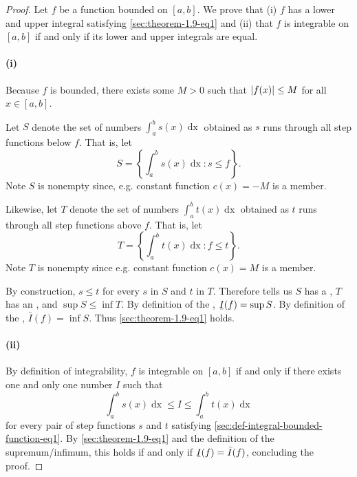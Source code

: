 \documentclass{report}
\begin{document}
\begin{proof}

  Let $f$ be a function bounded on $[a, b]$.
  We prove that (i) $f$ has a lower and upper integral satisfying
    \eqref{sec:theorem-1.9-eq1} and (ii) that $f$ is integrable on $[a, b]$ if
    and only if its lower and upper integrals are equal.

  \paragraph{(i)}%

    Because $f$ is bounded, there exists some $M > 0$ such that
      $\left|f(x)\right| \leq M$ for all $x \in [a, b]$.

    Let $S$ denote the set of numbers $\int_a^b s(x) \mathop{dx}$ obtained as
      $s$ runs through all step functions below $f$.
    That is, let $$S = \left\{ \int_a^b s(x) \mathop{dx} : s \leq f \right\}.$$
    Note $S$ is nonempty since, e.g. constant function $c(x) = -M$ is a member.

    Likewise, let $T$ denote the set of numbers $\int_a^b t(x) \mathop{dx}$
      obtained as $t$ runs through all step functions above $f$.
    That is, let $$T = \left\{ \int_a^b t(x) \mathop{dx} : f \leq t \right\}.$$
    Note $T$ is nonempty since e.g. constant function $c(x) = M$ is a member.

    By construction, $s \leq t$ for every $s$ in $S$ and $t$ in $T$.
    Therefore  tells us $S$ has a
      , $T$ has an , and
      $\sup{S} \leq \inf{T}$.
    By definition of the ,
      $\ubar{I}(f) = \sup{S}$.
    By definition of the ,
      $\bar{I}(f) = \inf{S}$.
    Thus \eqref{sec:theorem-1.9-eq1} holds.

  \paragraph{(ii)}%

    By definition of integrability, $f$ is integrable on $[a, b]$ if and only if
      there exists one and only one number $I$ such that
      $$\int_a^b s(x) \mathop{dx} \leq I \leq \int_a^b t(x) \mathop{dx}$$
      for every pair of step functions $s$ and $t$ satisfying
      \eqref{sec:def-integral-bounded-function-eq1}.
    By \eqref{sec:theorem-1.9-eq1} and the definition of the supremum/infimum,
      this holds if and only if $\ubar{I}(f) = \bar{I}(f)$, concluding the
      proof.

\end{proof}
\end{document}
